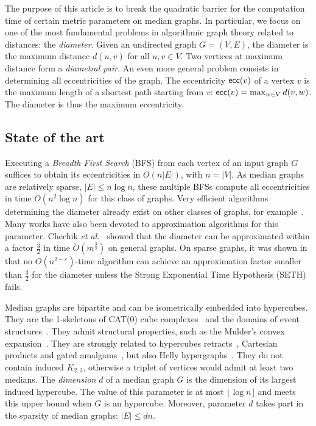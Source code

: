 \documentclass{article}
\newcommand{\card}[1]{\left| #1 \right|}
\newcommand{\ecc}{\mbox{\textsf{ecc}}}
\begin{document}
The purpose of this article is to break the quadratic barrier for the computation time of certain metric parameters on median graphs. In particular, we focus on one of the most fundamental problems in algorithmic graph theory related to distances: the \textit{diameter}. Given an undirected graph $G=(V,E)$, the diameter is the maximum distance $d(u,v)$ for all $u,v \in V$. Two vertices at maximum distance form a \textit{diametral pair}. An even more general problem consists in determining all eccentricities of the graph. The eccentricity $\ecc(v)$ of a vertex $v$ is the maximum length of a shortest path starting from $v$: $\ecc(v) = \max_{w \in V} d(v,w)$. The diameter is thus the maximum eccentricity.

\subsection{State of the art}

Executing a \textit{Breadth First Search} (BFS) from each vertex of an input graph $G$ suffices to obtain its eccentricities in $O(n\card{E})$, with $n = \card{V}$. As median graphs are relatively sparse, $\card{E} \le n\log n$, these multiple BFSs compute all eccentricities in time $O(n^2\log n)$ for this class of graphs.
Very efficient algorithms determining the diameter already exist on other classes of graphs, for example~\cite{AbWiWa16,Ca17,DuHaVi20}. Many works have also been devoted to approximation algorithms for this parameter. Chechik {\em et al.}~\cite{ChLaRoScTaWi14} showed that the diameter can be approximated within a factor $\frac{3}{2}$ in time $\tilde{O}(m^{\frac{3}{2}})$ on general graphs. On sparse graphs, it was shown in~\cite{RoWi13} that no $O(n^{2-\varepsilon})$-time algorithm can achieve an approximation factor smaller than $\frac{3}{2}$ for the diameter unless the Strong Exponential Time Hypothesis (SETH) fails.

Median graphs are bipartite and can be isometrically embedded into hypercubes. They are the 1-skeletons of CAT(0) cube complexes~\cite{Ch00} and the domains of event structures~\cite{BaCo93}. They admit structural properties, such as the Mulder's convex expansion~\cite{Mu78,Mu80}. They are strongly related to hypercubes retracts~\cite{Ba84}, Cartesian products and gated amalgams~\cite{BaCh08}, but also Helly hypergraphs~\cite{MuSc79}. They do not contain induced $K_{2,3}$, otherwise a triplet of vertices would admit at least two medians. The \textit{dimension} $d$ of a median graph $G$ is the dimension of its largest induced hypercube. The value of this parameter is at most $\lfloor \log n \rfloor$ and meets this upper bound when $G$ is an hypercube. Moreover, parameter $d$ takes part in the sparsity of median graphs: $\card{E} \le dn$.
\end{document}
